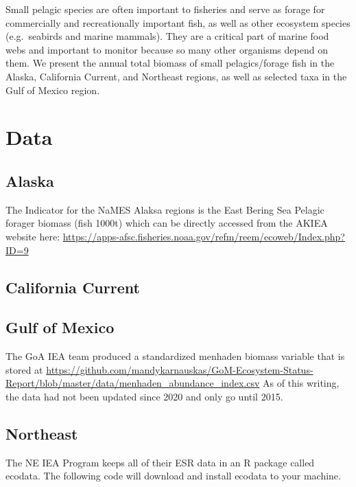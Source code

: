 \documentclass[
]{book}
\begin{document}
Small pelagic species are often important to fisheries and serve as forage for commercially and recreationally important fish, as well as other ecosystem species (e.g.~seabirds and marine mammals). They are a critical part of marine food webs and important to monitor because so many other organisms depend on them. We present the annual total biomass of small pelagics/forage fish in the Alaska, California Current, and Northeast regions, as well as selected taxa in the Gulf of Mexico region.

\hypertarget{data-3}{%
\section{Data}\label{data-3}}

\hypertarget{alaska}{%
\subsection{Alaska}\label{alaska}}

The Indicator for the NaMES Alaksa regions is the East Bering Sea Pelagic forager biomass (fish 1000t) which can be directly accessed from the AKIEA website here: \url{https://apps-afsc.fisheries.noaa.gov/refm/reem/ecoweb/Index.php?ID=9}

\hypertarget{california-current}{%
\subsection{California Current}\label{california-current}}

\hypertarget{gulf-of-mexico}{%
\subsection{Gulf of Mexico}\label{gulf-of-mexico}}

The GoA IEA team produced a standardized menhaden biomass variable that is stored at \url{https://github.com/mandykarnauskas/GoM-Ecosystem-Status-Report/blob/master/data/menhaden_abundance_index.csv} As of this writing, the data had not been updated since 2020 and only go until 2015.

\hypertarget{northeast}{%
\subsection{Northeast}\label{northeast}}

The NE IEA Program keeps all of their ESR data in an R package called ecodata. The following code will download and install ecodata to your machine.
\end{document}
